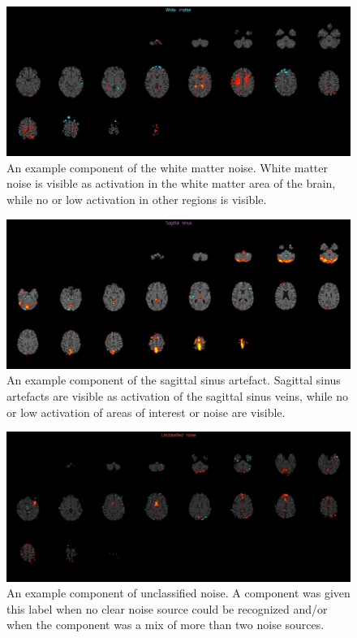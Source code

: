 \begin{figure}[H]                 
	\includegraphics[width=.85\textwidth]{figures/bMethods/white_matter}  
	\caption{An example component of the white matter noise. White matter noise is visible as activation in the white matter area of the brain, while no or low activation in other regions is visible.}
	\label{fig:meth:walter_white} 
\end{figure}


\begin{figure}[H]                 
	\includegraphics[width=.85\textwidth]{figures/bMethods/sag_sinus}  
	\caption{An example component of the sagittal sinus artefact. Sagittal sinus artefacts are visible as activation of the sagittal sinus veins, while no or low activation of areas of interest or noise are visible.}
	\label{fig:meth:sinus} 
\end{figure}

\begin{figure}[H]                 
	\includegraphics[width=.85\textwidth]{figures/bMethods/U_noise}  
	\caption{An example component of unclassified noise. A component was given this label when no clear noise source could be recognized and/or when the component was a mix of more than two noise sources.}
	\label{fig:meth:Unoise} 
\end{figure}


